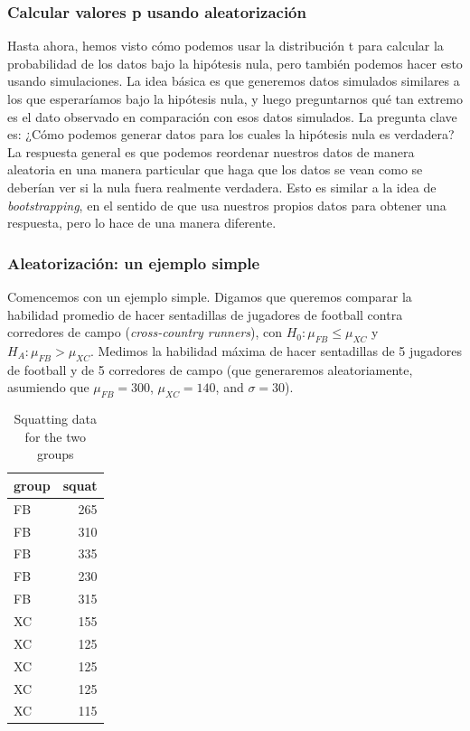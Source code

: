 \documentclass[
  12pt,
]{book}
\theoremstyle{definition}
\theoremstyle{definition}
\theoremstyle{definition}
\theoremstyle{remark}
\begin{document}
\hypertarget{calcular-valores-p-usando-aleatorizaciuxf3n}{%
\subsubsection{Calcular valores p usando aleatorización}\label{calcular-valores-p-usando-aleatorizaciuxf3n}}

Hasta ahora, hemos visto cómo podemos usar la distribución t para calcular la probabilidad de los datos bajo la hipótesis nula, pero también podemos hacer esto usando simulaciones. La idea básica es que generemos datos simulados similares a los que esperaríamos bajo la hipótesis nula, y luego preguntarnos qué tan extremo es el dato observado en comparación con esos datos simulados. La pregunta clave es: ¿Cómo podemos generar datos para los cuales la hipótesis nula es verdadera? La respuesta general es que podemos reordenar nuestros datos de manera aleatoria en una manera particular que haga que los datos se vean como se deberían ver si la nula fuera realmente verdadera. Esto es similar a la idea de \emph{bootstrapping}, en el sentido de que usa nuestros propios datos para obtener una respuesta, pero lo hace de una manera diferente.

\hypertarget{aleatorizaciuxf3n-un-ejemplo-simple}{%
\subsubsection{Aleatorización: un ejemplo simple}\label{aleatorizaciuxf3n-un-ejemplo-simple}}

Comencemos con un ejemplo simple. Digamos que queremos comparar la habilidad promedio de hacer sentadillas de jugadores de football contra corredores de campo (\emph{cross-country runners}), con \(H_0: \mu_{FB} \le \mu_{XC}\) y \(H_A: \mu_{FB} > \mu_{XC}\). Medimos la habilidad máxima de hacer sentadillas de 5 jugadores de football y de 5 corredores de campo (que generaremos aleatoriamente, asumiendo que \(\mu_{FB} = 300\), \(\mu_{XC} = 140\), and \(\sigma = 30\)).

\begin{table}

\caption{\label{tab:squatPlot}Squatting data for the two groups}
\centering
\begin{tabular}[t]{l|r}
\hline
group & squat\\
\hline
FB & 265\\
\hline
FB & 310\\
\hline
FB & 335\\
\hline
FB & 230\\
\hline
FB & 315\\
\hline
XC & 155\\
\hline
XC & 125\\
\hline
XC & 125\\
\hline
XC & 125\\
\hline
XC & 115\\
\hline
\end{tabular}
\end{table}
\end{document}
